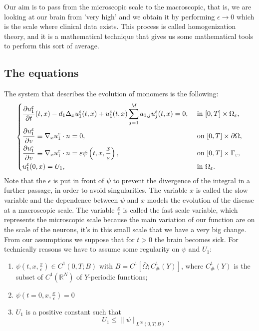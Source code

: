 Our aim is to pass from the microscopic scale to the macroscopic, that is, we are looking at our brain from 'very high' and we obtain it by performing $\epsilon \rightarrow 0$ which is the scale where clinical data exists. This process is called homogenization theory, and it is a mathematical technique that gives us some mathematical tools to perform this sort of average.
\subsection{The equations}
The system that describes the evolution of monomers is the following:
\begin{equation}
    \begin{dcases}
    \frac{\partial u_{1}^{\epsilon}}{\partial t}(t, x)-d_{1} \Delta_{x} u_{1}^{\epsilon}(t, x)+u_{1}^{\epsilon}(t, x) \sum_{j=1}^{M} a_{1, j} u_{j}^{\epsilon}(t, x)=0, & \text { in }[0, T] \times \Omega_{\epsilon},\\
    \frac{\partial u^{\epsilon}_1}{\partial v} \equiv \nabla_{x} u^{\epsilon}_1\cdot n=0, & \text { on }[0, T]\times\partial\Omega,\\
    \frac{\partial u^{\epsilon}_{1}}{\partial v} \equiv \nabla_{x} u^{\epsilon}_1 \cdot n=\epsilon \psi\left(t, x,\frac{x}{\epsilon}\right), & \text { on }[0, T] \times \Gamma_{\epsilon},\\
    u_{1}^{\epsilon}(0, x)=U_{1}, & \text{ in }\Omega_{\epsilon}.
    \end{dcases}
\label{eq:u_1_eqs}\end{equation}
Note that the $\epsilon$ is put in front of $\psi$ to prevent the divergence of the integral in a further passage, in order to avoid singularities. 
The variable $x$ is called the slow variable and the dependence between $\psi$ and $x$ models the evolution of the disease at a macroscopic scale. The variable
$\frac{x}{\epsilon}$ is called the fast scale variable, which represents the microscopic scale because the main variation of our function are on the scale of the neurons, it's in this small scale that we have a very big change.\\
From our assumptions we suppose that for $t>0$ the brain becomes sick. For technically reasons we have to assume some regularity on $\psi$ and $U_1$:
\begin{enumerate}
    \item $\psi\left(t, x, \frac{x}{\epsilon}\right) \in C^{1}(0, T ; B)$ with $B=C^{1}\left[\bar{\Omega} ; C_{\text {\# }}^{1}(Y)\right]$, where $C_{\#}^{1}(Y)$ is the subset of $C^{1}\left(\mathbb{R}^{N}\right)$ of $Y$-periodic functions;
    \item $\psi\left(t=0, x, \frac{x}{\epsilon}\right)=0$
    \item 
$U_{1}$ is a positive constant such that
\begin{equation}
  U_{1} \leq\|\psi\|_{L^{\infty}(0, T ; B)} .
\label{eq:U_1_norm}\end{equation}
\end{enumerate}
